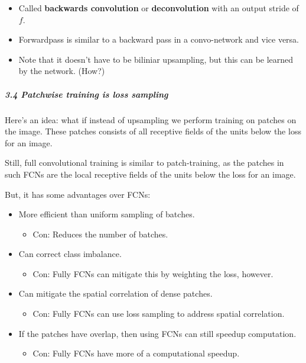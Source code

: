 \documentclass[]{article}
\let\oldsubparagraph\subparagraph
\renewcommand{\subparagraph}[1]{\oldsubparagraph{#1}\mbox{}}
\begin{document}
\begin{itemize}
\item
  Called \textbf{backwards convolution} or \textbf{deconvolution} with
  an output stride of \(f\).
\item
  Forwardpass is similar to a backward pass in a convo-network and vice
  versa.
\item
  Note that it doesn't have to be biliniar upsampling, but this can be
  learned by the network. (How?)
\end{itemize}

\subparagraph{3.4 Patchwise training is loss
sampling}\label{header-n184}

Here's an idea: what if instead of upsampling we perform training on
patches on the image. These patches consists of all receptive fields of
the units below the loss for an image.

Still, full convolutional training is similar to patch-training, as the
patches in such FCNs are the local receptive fields of the units below
the loss for an image.

But, it has some advantages over FCNs:

\begin{itemize}
\item
  More efficient than uniform sampling of batches.

  \begin{itemize}
  \item
    Con: Reduces the number of batches. 
  \end{itemize}
\end{itemize}

\begin{itemize}
\item
  Can correct class imbalance.

  \begin{itemize}
  \item
    Con: Fully FCNs can mitigate this by weighting the loss, however.
  \end{itemize}
\item
  Can mitigate the spatial correlation of dense patches.

  \begin{itemize}
  \item
    Con: Fully FCNs can use loss sampling to address spatial
    correlation.
  \end{itemize}
\item
  If the patches have overlap, then using FCNs can still speedup
  computation.

  \begin{itemize}
  \item
    Con: Fully FCNs have more of a computational speedup.
  \end{itemize}
\end{itemize}
\end{document}
